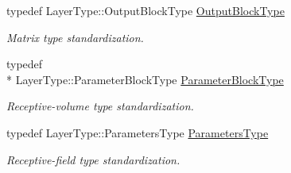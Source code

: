\begin{DoxyCompactItemize}
typedef Layer\-Type\-::\-Output\-Block\-Type \hyperlink{classffnn_1_1optimizer_1_1_gradient_descent_3_01layer_1_1_local_convolution_3_01_t_a_r_g_s_01_4_01_4_aa20bbed306ab91d1e49da41491764c11}{Output\-Block\-Type}
\begin{DoxyCompactList}\small\item\em Matrix type standardization. \end{DoxyCompactList}\item 
typedef \\*
Layer\-Type\-::\-Parameter\-Block\-Type \hyperlink{classffnn_1_1optimizer_1_1_gradient_descent_3_01layer_1_1_local_convolution_3_01_t_a_r_g_s_01_4_01_4_aa3cf2a9b7dd4078926511651277aa953}{Parameter\-Block\-Type}
\begin{DoxyCompactList}\small\item\em Receptive-\/volume type standardization. \end{DoxyCompactList}\item 
typedef Layer\-Type\-::\-Parameters\-Type \hyperlink{classffnn_1_1optimizer_1_1_gradient_descent_3_01layer_1_1_local_convolution_3_01_t_a_r_g_s_01_4_01_4_ac7acd851ffa7a846dc07b2ef46a265ec}{Parameters\-Type}
\begin{DoxyCompactList}\small\item\em Receptive-\/field type standardization. \end{DoxyCompactList}\end{DoxyCompactItemize}
